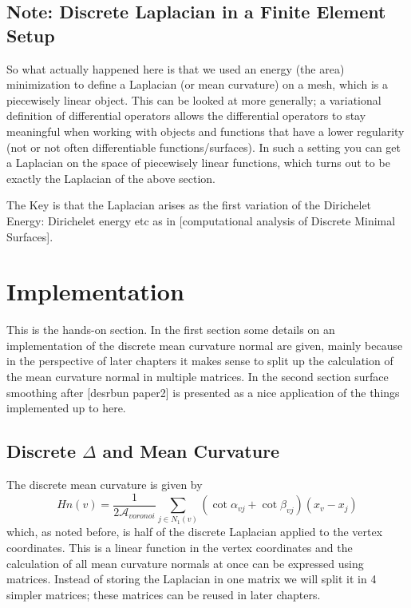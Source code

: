 \subsection{Note: Discrete Laplacian in a Finite Element Setup}
So what actually happened here is that we used an energy (the area) minimization to define a Laplacian (or mean curvature) on a mesh, which is a piecewisely linear object. This can be looked at more generally; a variational definition of differential operators allows the differential operators to stay meaningful when working with objects and functions that have a lower regularity (not or not often differentiable functions/surfaces). In such a setting you can get a Laplacian on the space of piecewisely linear functions, which turns out to be exactly the Laplacian of the above section.

The Key is that the Laplacian arises as the first variation of the Dirichelet Energy: 
Dirichelet energy etc as in [computational analysis of Discrete Minimal Surfaces].

\section{Implementation}
This is the hands-on section. In the first section some details on an implementation of the discrete mean curvature normal are given, mainly because in the perspective of later chapters it makes sense to split up the calculation of the mean curvature normal in multiple matrices. In the second section surface smoothing after [desrbun paper2] is presented as a nice application of the things implemented up to here.

\subsection{Discrete $\Delta$ and Mean Curvature}
The discrete mean curvature is given by
\[Hn (v) = \frac{1}{2\mathcal A_{voronoi}}\sum_{j\in N_1(v)} (\cot \alpha_{vj} + \cot \beta_{vj})(x_v-x_j)\] 
which, as noted before, is half of the discrete Laplacian applied to the vertex coordinates. This is a linear function in the vertex coordinates and the calculation of all mean curvature normals at once can be expressed using matrices. Instead of storing the Laplacian in one matrix we will split it in 4 simpler matrices; these matrices can be reused in later chapters.

